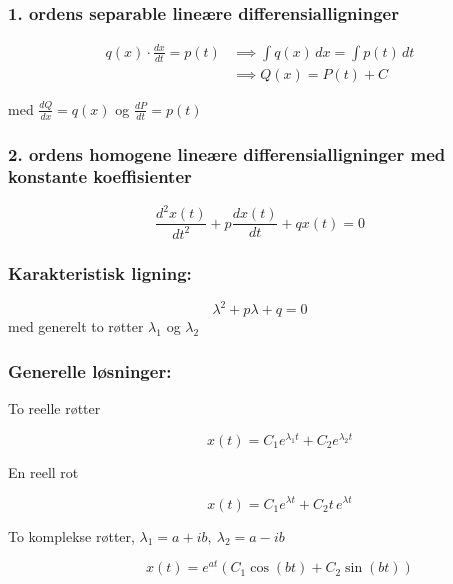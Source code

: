 \documentclass[a4paper,9pt]{extarticle}
\begin{document}
\begin{multicols}{2}
\subsubsection*{1. ordens separable lineære differensialligninger}
\begin{equation*}
    \begin{split}
        q(x) \cdot \frac{dx}{dt} = p(t) &\implies \int q(x) \, dx = \int p(t) \, dt \\
        &\implies Q(x) = P(t) + C
    \end{split}
\end{equation*}


med $\frac{dQ}{dx} = q(x)$ og $\frac{dP}{dt} = p(t)$


\subsubsection*{2. ordens homogene lineære differensialligninger med konstante koeffisienter}
\[
\frac{d^2 x(t)}{dt^2} + p \frac{dx(t)}{dt} + qx(t) = 0
\]
\subsubsection*{Karakteristisk ligning:}
\[
\lambda^2 + p\lambda + q = 0
\]
med generelt to røtter $\lambda_1$ og $\lambda_2$

\subsubsection*{Generelle løsninger:}
\begin{description}
\item [To reelle røtter] \[ x(t) = C_1 e^{\lambda_1 t} + C_2 e^{\lambda_2 t} \]
\item [En reell rot] \[ x(t) = C_1 e^{\lambda t} + C_2 t \, e^{\lambda t} \]
\item [To komplekse røtter, $\lambda_1 = a + ib, \  \lambda_2 = a - ib$]  \[ x(t) = e^{at}(C_1 \cos(bt) + C_2 \sin(bt)) \]
\end{description}










\end{multicols}
\end{document}
